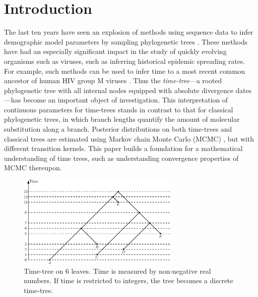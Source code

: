 \documentclass[11pt]{amsart}
\theoremstyle{definition}
\begin{document}
\maketitle

\thispagestyle{empty}
\addtocounter{page}{-1}
\newpage


\section{Introduction}
The last ten years have seen an explosion of methods using sequence data to infer demographic model parameters by sampling phylogenetic trees \autocite{Kuhner1995-mj,Kuhner1998-tq,Kuhner2000-af,Beerli2001-sc,Kuhner2006-vx,Drummond2002,Drummond2005-ks,Drummond2006-oa,Minin2008-wz}.
These methods have had an especially significant impact in the study of quickly evolving organisms such as viruses, such as inferring historical epidemic spreading rates.
For example, such methods can be used to infer time to a most recent common ancestor of human HIV group M viruses \autocite{Worobey2008-rt,Baele2013-op}.
Thus the \emph{time-tree}---a rooted phylogenetic tree with all internal nodes equipped with absolute divergence dates---has become an important object of investigation.
This interpretation of continuous parameters for time-trees stands in contrast to that for classical phylogenetic trees, in which branch lengths quantify the amount of molecular substitution along a branch.
Posterior distributions on both time-trees and classical trees are estimated using Markov chain Monte Carlo (MCMC) \autocite{Mau1997-sq,Yang1997-gv,Drummond2002}, but with different transition kernels.
This paper builds a foundation for a mathematical understanding of time trees, such as understanding convergence properties of MCMC thereupon.

\begin{figure}[ht]
\centering
\includegraphics[width=0.7\textwidth]{timeTree.eps}
\caption{Time-tree on $6$ leaves.
Time is measured by non-negative real numbers.
If time is restricted to integers, the tree becomes a discrete time-tree.}
\label{timeTree.eps}
\end{figure}
\end{document}
